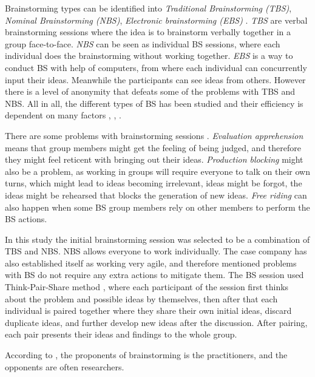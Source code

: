 \documentclass[english, 12pt, a4paper, sci, utf8, a-1b, online]{aaltothesis}
\begin{document}
Brainstorming types can be identified into \textit{Traditional Brainstorming (TBS)}, \textit{Nominal Brainstorming (NBS)}, \textit{Electronic brainstorming (EBS)} \citep{brainstorming-techniques}. \textit{TBS} are verbal brainstorming sessions where the idea is to brainstorm verbally together in a group face-to-face. \textit{NBS} can be seen as individual BS sessions, where each individual does the brainstorming without working together. \textit{EBS} is a way to conduct BS with help of computers, from where each individual can concurrently input their ideas. Meanwhile the participants can see ideas from others. However there is a level of anonymity that defeats some of the problems with TBS and NBS.  All in all, the different types of BS has been studied and their efficiency is dependent on many factors \citep{productivity-loss-in-brainstorming-groups}, \citep{electronic-brainstorming}, \citep{chainstorm}.

There are some problems with brainstorming sessions \citep{electronic-brainstorming} \citep{chainstorm}. \textit{Evaluation apprehension} means that group members might get the feeling of being judged, and therefore they might feel reticent with bringing out their ideas. \textit{Production blocking} might also be a problem, as working in groups will require everyone to talk on their own turns, which might lead to ideas becoming irrelevant, ideas might be forgot, the ideas might be rehearsed that blocks the generation of new ideas. \textit{Free riding} can also happen when some BS group members rely on other members to perform the BS actions.

In this study the initial brainstorming session was selected to be a combination of TBS and NBS. NBS allows everyone to work individually. The case company has also established itself as working very agile, and therefore mentioned problems with BS do not require any extra actions to mitigate them. The BS session used Think-Pair-Share method \citep{think-pair-share}, where each participant of the session first thinks about the problem and possible ideas by themselves, then after that each individual is paired together where they share their own initial ideas, discard duplicate ideas, and further develop new ideas after the discussion. After pairing, each pair presents their ideas and findings to the whole group. 

According to \cite{six-issues-of-brainstorming}, the proponents of brainstorming is the practitioners, and the opponents are often researchers.
\end{document}
